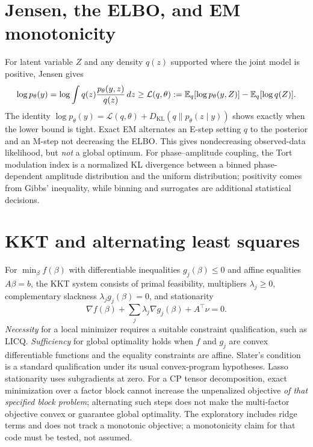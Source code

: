 \section{Jensen, the ELBO, and EM monotonicity}
For latent variable $Z$ and any density $q(z)$ supported
where the joint model is positive, Jensen gives
\[
\log p_\theta(y)
=\log\int q(z)\frac{p_\theta(y,z)}{q(z)}\,dz
\ge \mathcal L(q,\theta)
:=\mathbb{E}_q[\log p_\theta(y,Z)]-\mathbb{E}_q[\log q(Z)].
\]
The identity
$\log p_\theta(y)=\mathcal L(q,\theta)
 +D_{\mathrm{KL}}(q\|p_\theta(z\mid y))$
shows exactly when the lower bound is tight.
Exact EM alternates an E-step setting $q$ to the posterior and
an M-step not decreasing the ELBO. This gives nondecreasing
observed-data likelihood, but \emph{not} a global optimum.
For phase--amplitude coupling, the Tort modulation index is
a normalized KL divergence between a binned phase-dependent
amplitude distribution and the uniform distribution; positivity
comes from Gibbs' inequality, while binning and surrogates
are additional statistical decisions.

\section{KKT and alternating least squares}
For $\min_\beta f(\beta)$ with differentiable inequalities
$g_j(\beta)\le0$ and affine equalities $A\beta=b$,
the KKT system consists of primal feasibility,
multipliers $\lambda_j\ge0$, complementary slackness
$\lambda_jg_j(\beta)=0$, and stationarity
\[
\nabla f(\beta)+\sum_j\lambda_j\nabla g_j(\beta)+A^\top\nu=0.
\]
\emph{Necessity} for a local minimizer requires a suitable
constraint qualification, such as LICQ.
\emph{Sufficiency} for global optimality holds when
$f$ and $g_j$ are convex differentiable functions and
the equality constraints are affine.
Slater's condition is a standard qualification under its
usual convex-program hypotheses. Lasso stationarity uses
subgradients at zero.
For a CP tensor decomposition, exact minimization over a factor
block cannot increase the unpenalized objective \emph{of that
specified block problem}; alternating such steps does not
make the multi-factor objective convex or guarantee global
optimality. The exploratory 
includes ridge terms and does not track a monotonic objective;
a monotonicity claim for that code must be tested, not assumed.